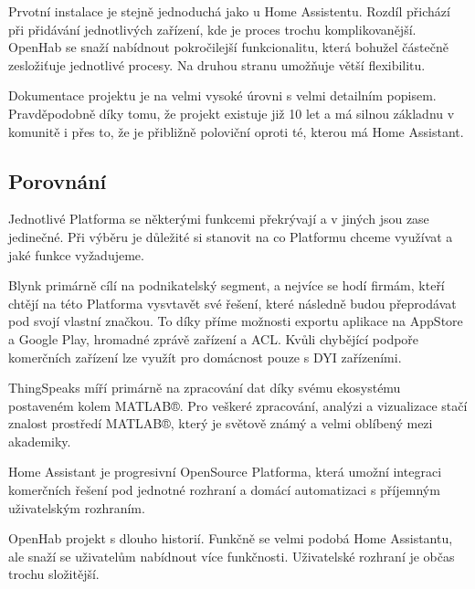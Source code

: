 \documentclass[thesis=B,czech]{FITthesis}[2019/12/23]
\begin{document}
Prvotní instalace je stejně jednoduchá jako u Home Assistentu. Rozdíl přichází při přidávání jednotlivých zařízení, kde je proces trochu komplikovanější. OpenHab se snaží nabídnout pokročilejší funkcionalitu, která bohužel částečně zesložiťuje jednotlivé procesy. Na druhou stranu umožňuje větší flexibilitu.

Dokumentace projektu je na velmi vysoké úrovni s velmi detailním popisem. Pravděpodobně díky tomu, že projekt existuje již 10 let a má silnou základnu v komunitě i přes to, že je přibližně poloviční oproti té, kterou má Home Assistant.

\subsection{Porovnání}
Jednotlivé Platforma se některými funkcemi překrývají a v jiných jsou zase jedinečné. Při výběru je důležité si stanovit na co Platformu chceme využívat a jaké funkce vyžadujeme.

Blynk primárně cílí na podnikatelský segment, a nejvíce se hodí firmám, kteří chtějí na této Platforma vysvtavět své řešení, které následně budou přeprodávat pod svojí vlastní značkou. To díky příme možnosti exportu aplikace na AppStore a Google Play, hromadné zprávě zařízení a ACL. Kvůli chybějící podpoře komerčních zařízení lze využít pro domácnost pouze s DYI zařízeními.

ThingSpeaks míří primárně na zpracování dat díky svému ekosystému postaveném kolem MATLAB®. Pro veškeré zpracování, analýzi a vizualizace stačí znalost prostředí MATLAB®, který je světově známý a velmi oblíbený mezi akademiky.

Home Assistant je progresivní OpenSource Platforma, která umožní integraci komerčních řešení pod jednotné rozhraní a domácí automatizaci s příjemným uživatelským rozhraním.

OpenHab projekt s dlouho historií. Funkčně se velmi podobá Home Assistantu, ale snaží se uživatelům nabídnout více funkčnosti. Uživatelské rozhraní je občas trochu složitější.
\end{document}
